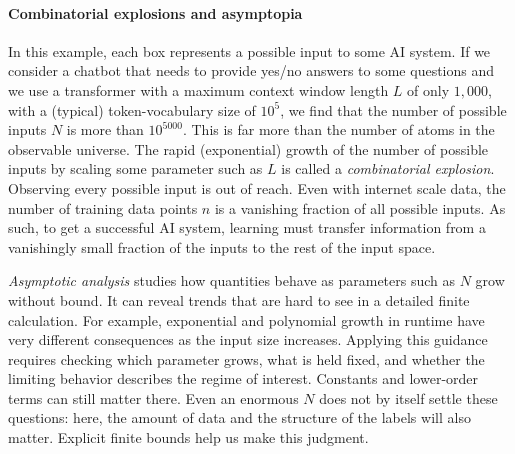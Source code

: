 \documentclass[11pt,twoside]{article}
\theoremstyle{definition}
\theoremstyle{remark}
\begin{document}
\paragraph{Combinatorial explosions and asymptopia}
In this example,
each box represents a possible input to some AI system.
If we consider a chatbot that needs to provide yes/no answers to some questions
and we use
a transformer with a maximum context window length $L$ of only $1,000$,
with a (typical) token-vocabulary size of $10^5$, we find that the number
of possible inputs $N$ is
more than $10^{5000}$. This is far more than the number of atoms in the observable
universe.
The rapid (exponential) growth of the number of possible inputs by scaling some parameter such as
$L$ is called a \emph{combinatorial explosion}.
Observing every possible input is out of reach.
Even with internet scale data, the number of training data points $n$ is a
vanishing fraction of all possible inputs.
As such, to get a successful AI system,
learning must transfer information from a vanishingly small fraction
of the inputs to the rest of the input space.

\emph{Asymptotic analysis} studies how quantities behave as parameters such as $N$
grow without bound. It can reveal trends that are hard to see in a detailed
finite calculation. For example, exponential and polynomial growth in runtime
have very different consequences as the input size increases. Applying this
guidance requires checking which parameter grows, what is held fixed, and
whether the limiting behavior describes the regime of interest. Constants and
lower-order terms can still matter there. Even an enormous $N$ does not by
itself settle these questions: here, the amount of data and the structure of
the labels will also matter. Explicit finite bounds help us make this judgment.
\end{document}
